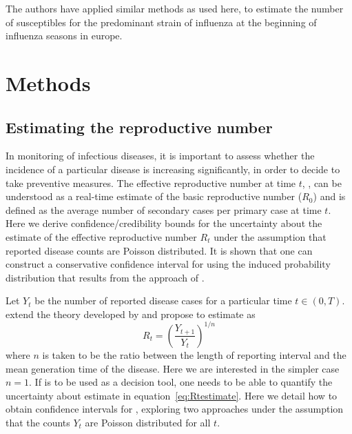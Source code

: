 The authors have applied similar methods as used here, to estimate the number 
of susceptibles for the predominant strain of influenza at the beginning of  
influenza seasons in europe\cite{pone2011}.


\section*{Methods}

\subsection*{Estimating the reproductive number}

In monitoring of infectious diseases, it is important to assess whether the 
incidence of a  particular disease is increasing significantly, in order to 
decide to take preventive measures.
The effective reproductive number at time $t$, \rr, can be understood as a 
real-time estimate of the basic reproductive number ($R_{0}$) and is defined as 
the average number of secondary cases per primary case at time $t$.
Here we derive confidence/credibility bounds for the uncertainty about the 
estimate of the effective reproductive number $R_t$ under the assumption that 
reported disease counts are Poisson distributed.
It is shown that one can construct a conservative confidence interval for \rr 
using the induced probability distribution that results from the approach of 
\cite{mantel}.

Let $Y_t$ be the number of reported disease cases for a particular time $t \in 
(0, T)$.
\cite{nishiura} extend the theory developed by \cite{stallybrass} and propose 
to estimate \rr as
\begin{equation}
\label{eq:Rtestimate}
R_t = \left( \frac{Y_{t+1}}{Y_t}\right)^{1/n}
\end{equation}
where $n$ is taken to be the ratio between the length of reporting interval and 
the mean generation time of the disease.
Here we are interested in the simpler case $n=1$.
If \rr is to be used as a decision tool, one needs to be able to quantify the 
uncertainty about estimate in equation~\ref{eq:Rtestimate}. 
Here we detail how to obtain confidence intervals for \rr, exploring two 
approaches under the assumption that the counts $Y_t$ are Poisson distributed 
for all $t$.

